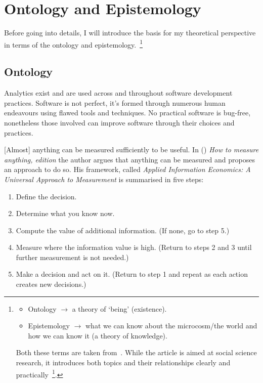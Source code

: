 \section{Ontology and Epistemology}
Before going into details, I will introduce the basis for my theoretical perspective in terms of the ontology and epistemology.~\footnote{
\begin{itemize}
    \item Ontology \( \rightarrow \) a theory of `being' (existence).
    \item Epistemology \( \rightarrow \) what we can know about the microcosm/the world and how we can know it (a theory of knowledge).
\end{itemize}

Both these terms are taken from~\cite{marsh2002skin}. While the article is aimed at social science research, it introduces both topics and their relationships clearly and practically~\footnote{Note: newer versions of the introductory material is published in a book: \href{https://www.macmillanihe.com/page/detail/Theory-and-Methods-in-Political-Science/?K=9781137603517}{\emph{``Theory and Methods in Political Science ( Edition)".}}}.
}

\subsection{Ontology}
Analytics exist and are used across and throughout software development practices. Software is not perfect, it's formed through numerous human endeavours using flawed tools and techniques. No practical software is bug-free, nonetheless those involved can improve software through their choices and practices.

[Almost] anything can be measured sufficiently to be useful. In (\cite{hubbard2014measure}) \emph{How to measure anything,  edition} the author argues that anything can be measured and proposes an approach to do so. His framework, called \emph{Applied Information Economics: A Universal Approach to Measurement} is summarised in five steps:

\begin{enumerate}
    \item Define the decision.
    \item Determine what you know now.
    \item Compute the value of additional information. (If none, go to step 5.)
    \item Measure where the information value is high. (Return to steps 2 and 3 until further measurement is not needed.)
    \item Make a decision and act on it. (Return to step 1 and repeat as each action creates new decisions.)
\end{enumerate} %


